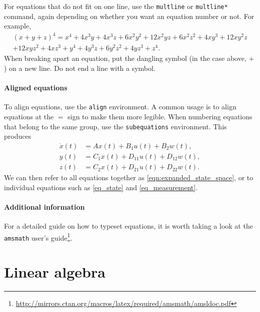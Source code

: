 For equations that do not fit on one line, use the \verb|multline| or \verb|multline*| command, again depending on whether you want an equation number or not. For example,
\begin{multline}
	(x+y+z)^4 =
	x^4+4 x^3 y+4 x^3 z+6 x^2 y^2+12 x^2 y z+6 x^2 z^2+4 x y^3+12 x y^2 z\\
	+12 x y z^2+4 x z^3+y^4+4 y^3 z+6 y^2 z^2+4 y z^3+z^4.
\end{multline}
When breaking apart an equation, put the dangling symbol (in the case above, $+$) on a new line. Do not end a line with a symbol.

\paragraph{Aligned equations}

To align equations, use the \verb|align| environment. A common usage is to align equations at the $=$ sign to make them more legible. When numbering equations that belong to the same group, use the \verb|subequations| environment. This produces
\begin{subequations} \label{eqn:expanded_state_space}
\begin{align}
\dot x(t) &= A   x(t) + B_1    u(t) + B_2    w(t), \label{eq_state}       \\
  	 y(t) &= C_1 x(t) + D_{11} u(t) + D_{12} w(t), \label{eq_measurement} \\
	 z(t) &= C_2   x(t) + D_{21} u(t) + D_{22} w(t). \label{eq_regulation}
\end{align}
\end{subequations}
We can then refer to all equations together as \eqref{eqn:expanded_state_space}, or to individual equations such as \eqref{eq_state} and \eqref{eq_measurement}.

\paragraph{Additional information}

For a detailed guide on how to typeset equations, it is worth taking a look at the \verb|amsmath| user's guide\footnote{\url{http://mirrors.ctan.org/macros/latex/required/amsmath/amsldoc.pdf}}.


\section{Linear algebra}

